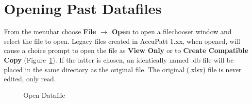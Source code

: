 \documentclass[10pt,letterpaper,titlepage]{article}
\begin{document}
    \section{Opening Past Datafiles}
    From the menubar choose \textbf{File $\rightarrow$ Open} to open a filechooser window and select the file to open. Legacy files created in AccuPatt 1.xx, when opened, will cause a choice prompt to open the file as \textbf{View Only} or to \textbf{Create Compatible Copy} (Figure~\ref{fig:open}). If the latter is chosen, an identically named .db file will be placed in the same directory as the original file. The original (.xlsx) file is never edited, only read.
    \begin{figure}[hb]
        \centering
        \caption{Open Datafile}
        \label{fig:open}
    \end{figure}
    \newpage
\end{document}
